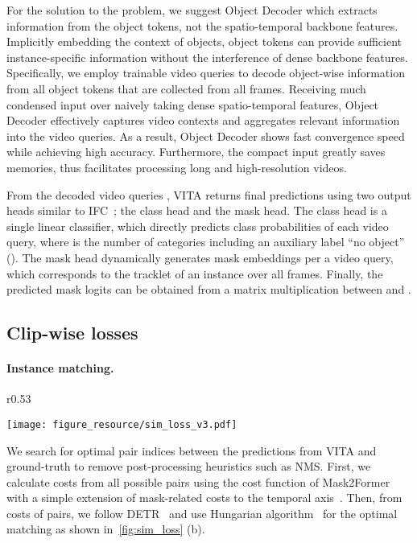 \documentclass{article}
\begin{document}
For the solution to the problem, we suggest Object Decoder which extracts information from the object tokens, not the spatio-temporal backbone features.
Implicitly embedding the context of objects, object tokens can provide sufficient instance-specific information without the interference of dense backbone features.
Specifically, we employ  trainable video queries  to decode object-wise information from all object tokens  that are collected from all  frames.
Receiving much condensed input over naively taking dense spatio-temporal features, Object Decoder effectively captures video contexts and aggregates relevant information into the video queries.
As a result, Object Decoder shows fast convergence speed while achieving high accuracy.
Furthermore, the compact input greatly saves memories, thus facilitates processing long and high-resolution videos.








From the decoded video queries , VITA returns final predictions  using two output heads similar to IFC~\cite{IFC}; the class head and the mask head.
The class head is a single linear classifier, which directly predicts class probabilities  of each video query, where  is the number of categories including an auxiliary label ``no object'' ().
The mask head dynamically generates mask embeddings  per a video query, which corresponds to the tracklet of an instance over all frames.
Finally, the predicted mask logits  can be obtained from a matrix multiplication between  and .


\subsection{Clip-wise losses}
\paragraph{Instance matching.}
\begin{wrapfigure}{r}{0.53\textwidth}
  \begin{center}
    \vspace{-7mm}
    \texttt{[image: figure\_resource/sim\_loss\_v3.pdf]}
  \end{center}
  \vspace{-4mm}
  \caption{
    Similarity loss.  and  indicate video query and frame query, respectively.
    Same color represents same GT instance ID.
  }
  \vspace{-8mm}
  \label{fig:sim_loss}
\end{wrapfigure}
We search for optimal pair indices between the predictions from VITA and  ground-truth to remove post-processing heuristics such as NMS.
First, we calculate costs from all possible pairs using the cost function of Mask2Former~\cite{Mask2Former} with a simple extension of mask-related costs to the temporal axis~\cite{IFC}.
Then, from  costs of pairs, we follow DETR~\cite{DETR} and use Hungarian algorithm~\cite{Hungarian} for the optimal matching as shown in~\cref{fig:sim_loss} (b).
\end{document}
